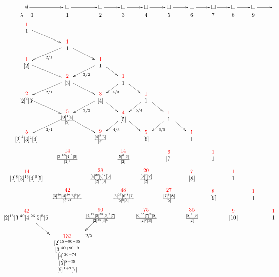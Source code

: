 %
\newcommand{\du}[2]{\begin{array}{c} \textcolor{red}{{#1}} \\ \hspace{-.321in}{#2}\hspace{-.321in} \end{array}}
\newcommand{\sqrr}{\square\ar[r]}
%
%
\[ { } \hspace{-.253in}
%
\xymatrix @C=15pt @R=1pt {
  {\emptyset}\ar[r] & \sqrr & \sqrr & \sqrr & \sqrr & \sqrr & \sqrr & \sqrr & \sqrr & \sqrr & { }
  \\
  {\lambda=0  }       &  1             &  2      &  3  &  4  &  5   & 6 & 7 & 8 & 9 
  \\  %
    {\du{1}{1} }\ar[dr]
    \\
& {\du{1}{1}}\ar[dr]\ar[dl]^{2/1}
\\ 
{\du{1}{{[2]}} }\ar[dr]    &                  &
{\du{1}{1}}\ar[dr]\ar[dl]^{3/2}
\\
&{\du{2}{[3]}} \ar[dr]\ar[dl]^{2/1}               &     &
{\du{1}{1}}\ar[dr]\ar[dl]^{4/3}
\\ 
{ \du{2}{{[ 2]}^2 [3]}}  \ar[dr]  &                     &
{\du{3}{[4]} }  \ar[dr]\ar[dl]^{3/2}  &    &
{\du{1}{1} } \ar[dr]\ar[dl]^{5/4}
\\
    & {\du{5}{{\frac{ [3]^4 [4]}{[2]}^{}}}}  \ar[dr]\ar[dl]^{2/1}   &  &
    {\du{4}{[5]}} \ar[dr]\ar[dl]^{4/3} &  &
    {\du{1}{1}} \ar[dr]\ar[dl]^{6/5}
    \\ 
    {\du{5}{{[2]}^4 [3]^4 [4]}} &              &
    {\du{9}{{\frac{[4]^5[5]}{[2]}^{}}}} &    &
    {\du{5}{[6]}} & &{ \du{1}{1} }
    \\ 
    &{\du{14}{\frac{[3]^{13}[4]^6[5]}{[2]^{6}}}} &&
    {\du{14}{\frac{[5]^6[6]}{[2]^{}}}} &&
    {\du{6}{[7]}} &&
    {\du{1}{1}}
 \\
   {\du{14}{[2]^8[3]^{13}[4]^6[5]}}  &&
   {\du{28}{\frac{[4]^{20}[5]^7[6]}{[2]^{7}[3]^{}}}} &&
   {\du{20}{\frac{[6]^7[7]}{[2]^{}}}} &&
   {\du{7}{[8]}}  &&
   {\du{1}{1}} \\
   & {\du{42}{\frac{[3]^{40}[4]^{26}[5]^8[6]}{[2]^{27}}}} &&
   {\du{48}{\frac{[5]^{27}[6]^8[7]}{[2]^{8}[3]^{}}}} &&
   {\du{27}{\frac{[7]^8[8]}{[2]^{}}}} &&
   {\du{8}{[9]}} &&
   {\du{1}{1}}
 \\
   {\du{42}{[2]^{15}[3]^{40}[4]^{26}[5]^{8}[6]}}\ar[dr] &&
   {\du{90}{\frac{[4]^{74}[5]^{35}[6]^{9}[7]}{[2]^{35}[3]^{9}}}}\ar[dl]^{3/2} &&
   {\du{75}{
       \frac{  [6]^{35}[7]^{9}[8]}{[2]^{9}[3]^{}}}} &&
   {\du{35}{\frac{[8]^9[9]}{[2]^{}}}} &&
   {\du{9}{[10]}} &&
   {\du{1}{1}}
   \\
   & { \begin{array}{c} { } \\ \textcolor{red}{132} \\ 
        {[2]^{15-90-35}} \\ {[3]^{40+90-9}} \\
        {[4]^{26+74}} \\ {[5]^{8+35}} \\ {[6]^{1+9}[7]}
        \end{array} }
}
\]

